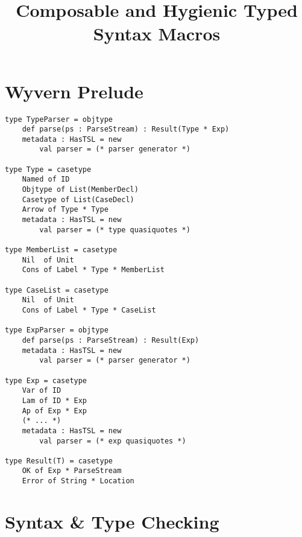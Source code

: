 \documentclass[letterpaper, notitlepage]{article}
\begin{document}
\title{Composable and Hygienic Typed Syntax Macros}
\maketitle

\section{Wyvern Prelude}
\begin{lstlisting}[style=wyvern]
type TypeParser = objtype
	def parse(ps : ParseStream) : Result(Type * Exp)
	metadata : HasTSL = new 
		val parser = (* parser generator *)

type Type = casetype
	Named of ID
	Objtype of List(MemberDecl)
	Casetype of List(CaseDecl)
	Arrow of Type * Type
	metadata : HasTSL = new
		val parser = (* type quasiquotes *)

type MemberList = casetype
	Nil  of Unit
	Cons of Label * Type * MemberList

type CaseList = casetype
	Nil  of Unit
	Cons of Label * Type * CaseList

type ExpParser = objtype
	def parse(ps : ParseStream) : Result(Exp)
	metadata : HasTSL = new 
		val parser = (* parser generator *)

type Exp = casetype
	Var of ID
	Lam of ID * Exp
	Ap of Exp * Exp
	(* ... *)
	metadata : HasTSL = new
		val parser = (* exp quasiquotes *)

type Result(T) = casetype
	OK of Exp * ParseStream
	Error of String * Location
\end{lstlisting}

\section{Syntax \& Type Checking}
\end{document}
